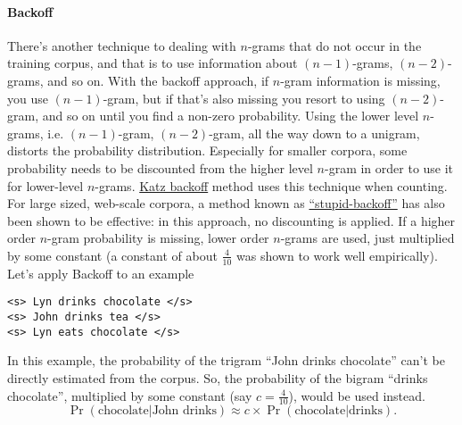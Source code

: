 \documentclass[12pt]{article}
\begin{document}
\paragraph{Backoff} There's another technique to dealing with $n$-grams that do not occur in the training corpus, and that is to use information about $(n-1)$-grams, $(n-2)$-grams, and so on. With the backoff approach, if $n$-gram information is missing, you use $(n-1)$-gram, but if that's also missing you resort to using $(n-2)$-gram, and so on until you find a non-zero probability. Using the lower level $n$-grams, i.e. $(n-1)$-gram, $(n-2)$-gram, all the way down to a unigram, distorts the probability distribution. Especially for smaller corpora, some probability needs to be discounted from the higher level $n$-gram in order to use it for lower-level $n$-grams. \href{https://en.wikipedia.org/wiki/Katz%27s_back-off_model}{Katz backoff} method uses this technique when counting. For large sized, web-scale corpora, a method known as \href{https://www.aclweb.org/anthology/D07-1090.pdf}{``stupid-backoff''} has also been shown to be effective: in this approach, no discounting is applied. If a higher order $n$-gram probability is missing, lower order $n$-grams are used, just multiplied by some constant (a constant of about $\frac{4}{10}$ was shown to work well empirically). Let's apply Backoff to an example
\begin{verbatim}
<s> Lyn drinks chocolate </s>
<s> John drinks tea </s>
<s> Lyn eats chocolate </s>
\end{verbatim}
In this example, the probability of the trigram ``John drinks chocolate'' can't be directly estimated from the corpus. So, the probability of the bigram ``drinks chocolate'', multiplied by some constant (say $c = \frac{4}{10}$), would be used instead.
\[
  \Pr(\textrm{chocolate} | \textrm{John drinks}) \approx c \times \Pr(\textrm{chocolate} | \textrm{drinks}).
\]
\end{document}
